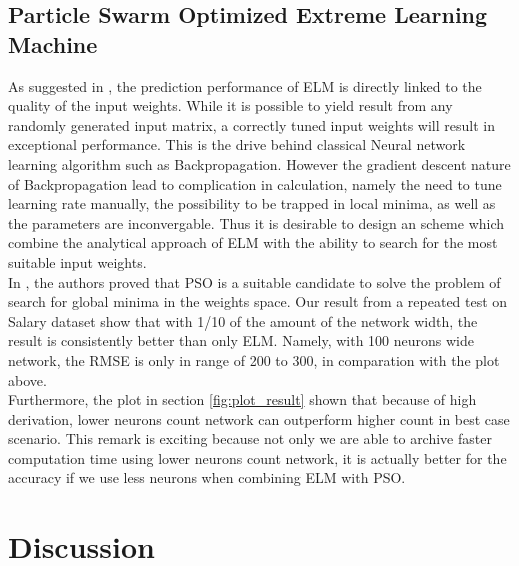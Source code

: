 \documentclass[13pt]{article}
\begin{document}
\subsection{Particle Swarm Optimized Extreme Learning Machine}
As suggested in \cite{hutchison_evolutionary_2006}, the prediction performance of ELM is directly linked to the quality of the input weights. While it is possible to yield result from any randomly generated input matrix, a correctly tuned input weights will result in exceptional performance. This is the drive behind classical Neural network learning algorithm such as Backpropagation. However the gradient descent nature of Backpropagation lead to complication in calculation, namely the need to tune learning rate manually, the possibility to be trapped in local minima, as well as the parameters are inconvergable. Thus it is desirable to design an scheme which combine the analytical approach of ELM with the ability to search for the most suitable input weights.\\
In \cite{hutchison_evolutionary_2006}, the authors proved that PSO is a suitable candidate to solve the problem of search for global minima in the weights space. Our result from a repeated test on Salary dataset show that with 1/10 of the amount of the network width, the result is consistently better than only ELM. Namely, with 100 neurons wide network, the RMSE is only in range of 200 to 300, in comparation with the plot above.\\
Furthermore, the plot in section \ref{fig:plot_result} shown that because of high derivation, lower neurons count network can outperform higher count in best case scenario. This remark is exciting because not only we are able to archive faster computation time using lower neurons count network, it is actually better for the accuracy if we use less neurons when combining ELM with PSO.
\newpage
\section{Discussion}
\end{document}
